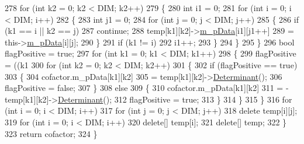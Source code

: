 \begin{DoxyCode}
278                     \textcolor{keywordflow}{for} (\textcolor{keywordtype}{int} k2 = 0; k2 < DIM; k2++)
279                     \{
280                         \textcolor{keywordtype}{int} i1 = 0;
281                         \textcolor{keywordflow}{for} (\textcolor{keywordtype}{int} i = 0; i < DIM; i++)
282                         \{
283                             \textcolor{keywordtype}{int} j1 = 0;
284                             \textcolor{keywordflow}{for} (\textcolor{keywordtype}{int} j = 0; j < DIM; j++)
285                             \{
286                                 \textcolor{keywordflow}{if} (k1 == i || k2 == j)
287                                     \textcolor{keywordflow}{continue};
288                                 temp[k1][k2]->\hyperlink{classCMatrix_ab0f18d68cad9b6d750d05a96b60a759d}{m\_pData}[i1][j1++]
289                                         = this->\hyperlink{classCMatrix_ab0f18d68cad9b6d750d05a96b60a759d}{m\_pData}[i][j];
290                             \}
291                             \textcolor{keywordflow}{if} (k1 != i)
292                                 i1++;
293                         \}
294                     \}
295                 \}
296                 \textcolor{keywordtype}{bool} flagPositive = \textcolor{keyword}{true};
297                 \textcolor{keywordflow}{for} (\textcolor{keywordtype}{int} k1 = 0; k1 < DIM; k1++)
298                 \{
299                     flagPositive = ((k1 %
300                     \textcolor{keywordflow}{for} (\textcolor{keywordtype}{int} k2 = 0; k2 < DIM; k2++)
301                     \{
302                         \textcolor{keywordflow}{if} (flagPositive == \textcolor{keyword}{true})
303                         \{
304                             cofactor.m\_pData[k1][k2]
305                                     = temp[k1][k2]->\hyperlink{classCMatrix_a865ff8f610be372e666fbf24d5b73a3a}{Determinant}();
306                             flagPositive = \textcolor{keyword}{false};
307                         \}
308                         \textcolor{keywordflow}{else}
309                         \{
310                             cofactor.m\_pData[k1][k2]
311                                     = -temp[k1][k2]->\hyperlink{classCMatrix_a865ff8f610be372e666fbf24d5b73a3a}{Determinant}();
312                             flagPositive = \textcolor{keyword}{true};
313                         \}
314                     \}
315                 \}
316                 \textcolor{keywordflow}{for} (\textcolor{keywordtype}{int} i = 0; i < DIM; i++)
317                     \textcolor{keywordflow}{for} (\textcolor{keywordtype}{int} j = 0; j < DIM; j++)
318                         \textcolor{keyword}{delete} temp[i][j];
319                 \textcolor{keywordflow}{for} (\textcolor{keywordtype}{int} i = 0; i < DIM; i++)
320                     \textcolor{keyword}{delete}[] temp[i];
321                 \textcolor{keyword}{delete}[] temp;
322             \}
323             \textcolor{keywordflow}{return} cofactor;
324         \}
\end{DoxyCode}


